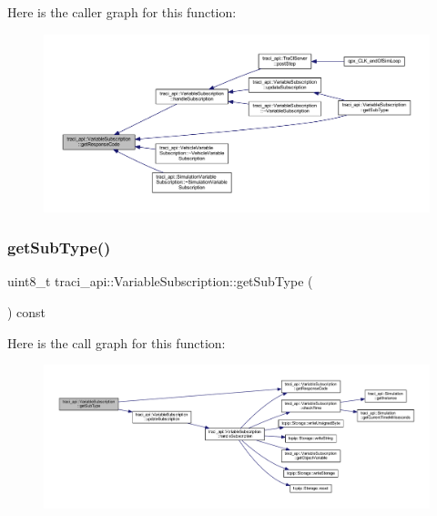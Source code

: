 Here is the caller graph for this function\+:
\nopagebreak
\begin{figure}[H]
\begin{center}
\leavevmode
\includegraphics[width=350pt]{classtraci__api_1_1_variable_subscription_a3e852072c435d02f96ff91f81506cef9_icgraph}
\end{center}
\end{figure}
\mbox{\label{classtraci__api_1_1_variable_subscription_a598f7414334878f7943bfadbbf6a42d4}} 
\subsubsection{\texorpdfstring{get\+Sub\+Type()}{getSubType()}}
{\footnotesize\ttfamily uint8\+\_\+t traci\+\_\+api\+::\+Variable\+Subscription\+::get\+Sub\+Type (\begin{DoxyParamCaption}{ }\end{DoxyParamCaption}) const\hspace{0.3cm}{\ttfamily [inline]}}

Here is the call graph for this function\+:
\nopagebreak
\begin{figure}[H]
\begin{center}
\leavevmode
\includegraphics[width=350pt]{classtraci__api_1_1_variable_subscription_a598f7414334878f7943bfadbbf6a42d4_cgraph}
\end{center}
\end{figure}
\mbox{\label{classtraci__api_1_1_variable_subscription_ab75320e8ec7d1406ea47a703fb09de63}} 
